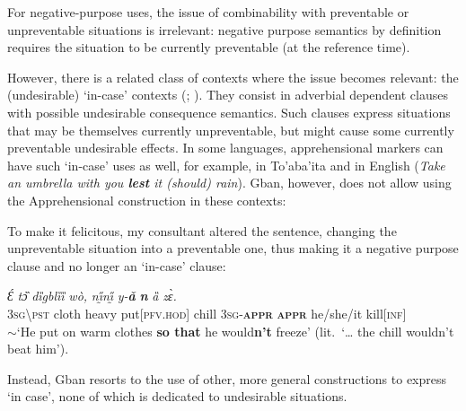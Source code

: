 \documentclass[output=paper,colorlinks,citecolor=brown
]{langscibook}
\begin{document}
For negative-purpose uses, the issue of combinability with preventable or unpreventable situations is irrelevant: negative purpose semantics by definition requires the situation to be currently preventable (at the reference time).

However, there is a related class of contexts where the issue becomes relevant: the (undesirable) `in-case' contexts (\cite[297--298]{lichtenberk1995}; \cite[279--280]{vuillermet2018}). They consist in adverbial dependent clauses with possible undesirable consequence semantics. Such clauses express situations that may be themselves currently unpreventable, but might cause some currently preventable undesirable effects. In some languages, apprehensional markers can have such `in-case' uses as well, for example, in To'aba'ita \parencite[301]{lichtenberk1995} and in English (\textit{Take an umbrella with you \textbf{lest} it (should) rain}). Gban, however, does not allow using the Apprehensional construction in these contexts:

\z

To make it felicitous, my consultant altered the sentence, changing the unpreventable situation into a preventable one, thus making it a negative purpose clause and no longer an `in-case' clause:


\ea \label{ex:Fed66prime}
\gll \textit{Ɛ́} \textit{tɔ̏} \textit{dȉgblȉȉ} \textit{wò,} \textit{nı̰̋nı̰̋} \textit{y-\textbf{ǎ}} \textit{\textbf{n{\ù}}} \textit{ȁ} \textit{zɛ̀.} \\
\textsc{3sg\backslash pst} cloth heavy put\textsc{[pfv.hod]} chill \textsc{3sg-\textbf{appr}} \textsc{\textbf{appr}} he/she/it kill[\textsc{inf}] \\
\glt $\sim$`He put on warm clothes \textbf{so that} he would\textbf{n't} freeze' (lit.\ `{\dots} the chill wouldn't beat him').
\z

\noindent Instead, Gban resorts to the use of other, more general constructions to express `in case', none of which is dedicated to undesirable situations.
\end{document}

